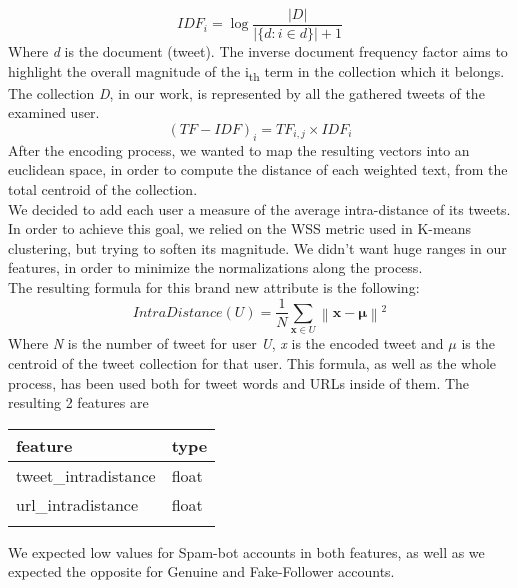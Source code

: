 \[ IDF_{i} =\log {\frac {|D|}{|\{d:i\in d\}| + 1}} \]
Where \textit{d} is the document (tweet).
The inverse document frequency factor aims to highlight the overall magnitude of the  i\textsubscript{th} term in the collection  which it belongs. The collection \textit{D}, in our work, is represented by all the gathered tweets of the examined user.
\[(TF-IDF)_{i} = TF_{i,j} \times IDF_{i} \]
After the encoding process, we wanted to map the resulting vectors into an euclidean space, in order to compute the distance of each weighted text, from the total centroid of the collection.\\
We decided to add each user a measure of the average intra-distance of its tweets.\\
In order to achieve this goal, we relied on the WSS metric used in K-means clustering, but trying to soften its magnitude. We didn't want huge ranges in our features, in order to minimize the normalizations along the process.\\
The resulting formula for this brand new attribute is the following:
\[IntraDistance(U) = \frac{1}{N}\sum _{\mathbf {x} \in U}\left\|\mathbf {x} -{\boldsymbol {\mu }}\right\|^{2}\]
Where \textit{N} is the number of tweet for user \textit{U}, \textit{x} is the encoded tweet and $\mu$ is the centroid of the tweet collection for that user.
This formula, as well as the whole process, has been used both for tweet words and URLs inside of them.
The resulting 2 features are
\small
\begin{center}
	\begin{tabular}{ll}
		\\feature&type\\
		\hline\hline
		tweet\_intradistance&float\\
		url\_intradistance&float\\\hline\\
	\end{tabular}
\end{center}
\normalsize
We expected low values for Spam-bot accounts in both features, as well as we expected the opposite for Genuine and Fake-Follower accounts.


